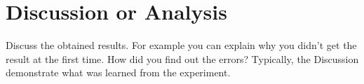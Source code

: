 \section{Discussion or Analysis}
Discuss the obtained results. For example you can explain why you didn’t get the result at the first time. How did you find out the errors?  Typically, the Discussion demonstrate what was learned from the experiment.

